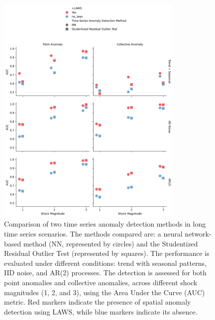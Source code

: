 \documentclass[11pt]{article}
\begin{document}
\begin{figure}[h]
    \centering
    \includegraphics[width=0.8\textwidth]{../figure/simulation_long_time_series.png}
    \caption{Comparison of two time series anomaly detection methods in long time series scenarios. The methods compared are: a neural network-based method (NN, represented by circles) and the Studentized Residual Outlier Test (represented by squares). The performance is evaluated under different conditions: trend with seasonal patterns, IID noise, and AR(2) processes. The detection is assessed for both point anomalies and collective anomalies, across different shock magnitudes (1, 2, and 3), using the Area Under the Curve (AUC) metric. Red markers indicate the presence of spatial anomaly detection using LAWS, while blue markers indicate its absence.}
    \label{fig: simulation long time series}
\end{figure}
\end{document}
